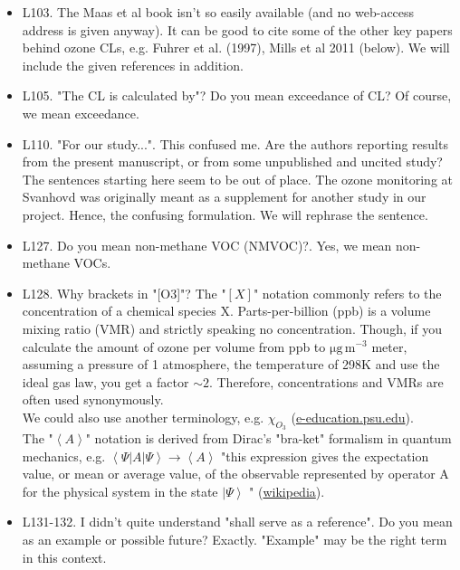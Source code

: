 \documentclass{scrartcl}
\begin{document}
\begin{itemize}
\item {\color{blue}L103. The Maas et al book isn't so easily available (and no web-access address is given anyway). It can be good to cite some of the other key papers behind ozone CLs, e.g. Fuhrer et al. (1997), Mills et al 2011 (below).}
We will include the given references in addition.

\item {\color{blue}L105. "The CL is calculated by"? Do you mean exceedance of CL?}
Of course, we mean exceedance.

\item {\color{blue}L110. "For our study...". This confused me. Are the authors reporting results from the present manuscript, or from some unpublished and uncited study? The sentences starting here seem to be out of place.}
The ozone monitoring at Svanhovd was originally meant as a supplement for another study in our project. Hence, the confusing formulation. We will rephrase the sentence.

\item {\color{blue}L127. Do you mean non-methane VOC (NMVOC)?.} 
Yes, we mean non-methane VOCs.

\item {\color{blue}L128. Why brackets in "[O3]"?}
The "$[X]$" notation commonly refers to the concentration of a chemical species X. Parts-per-billion (ppb) is a volume mixing ratio (VMR) and strictly speaking no concentration. Though, if you calculate the amount of ozone per volume from ppb to $\mathrm{\mu g\,m^{-3}}$ meter, assuming a pressure of 1 atmosphere, the temperature of 298K and use the ideal gas law, you get a factor $\sim 2$. Therefore, concentrations and VMRs are often used synonymously. \\We could also use another terminology, e.g. $\chi_{O_3}$ (\href{https://www.e-education.psu.edu/meteo300/node/534}{e-education.psu.edu}). \\The "$\left<A\right>$" notation is derived from Dirac's "bra-ket" formalism in quantum mechanics, e.g. $\left<\Psi |A|\Psi \right>\rightarrow \left<A\right>$ "this expression gives the expectation value, or mean or average value, of the observable represented by operator A for the physical system in the state $\left|\Psi \right>$ " (\href{https://en.wikipedia.org/wiki/Bra%E2%80%93ket_notation}{wikipedia}).

\item {\color{blue}L131-132. I didn't quite understand "shall serve as a reference". Do you mean as an example or possible future?}
Exactly. "Example" may be the right term in this context. 


\end{itemize}
\end{document}

